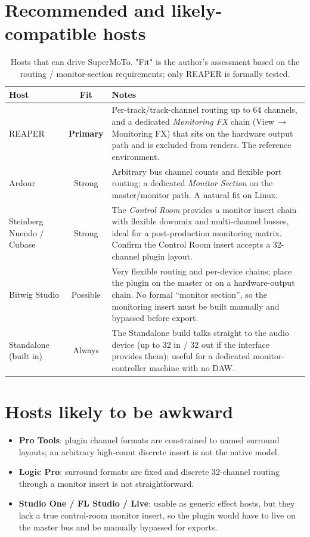 \section{Recommended and likely-compatible hosts}
\begin{table}[ht]
\centering
\renewcommand{\arraystretch}{1.3}
\begin{tabularx}{\textwidth}{l c X}
\toprule
\textbf{Host} & \textbf{Fit} & \textbf{Notes} \\
\midrule
REAPER & \textbf{Primary} &
  Per-track/track-channel routing up to 64 channels, and a dedicated
  \emph{Monitoring FX} chain (\textsf{View\,$\rightarrow$\,Monitoring FX})
  that sits on the hardware output path and is excluded from renders. The
  reference environment. \\
Ardour & Strong &
  Arbitrary bus channel counts and flexible port routing; a dedicated
  \emph{Monitor Section} on the master/monitor path. A natural fit on Linux. \\
Steinberg Nuendo / Cubase & Strong &
  The \emph{Control Room} provides a monitor insert chain with flexible
  downmix and multi-channel busses, ideal for a post-production monitoring
  matrix. Confirm the Control Room insert accepts a 32-channel plugin layout. \\
Bitwig Studio & Possible &
  Very flexible routing and per-device chains; place the plugin on the master
  or on a hardware-output chain. No formal ``monitor section'', so the
  monitoring insert must be built manually and bypassed before export. \\
Standalone (built in) & Always &
  The Standalone build talks straight to the audio device (up to 32 in / 32 out
  if the interface provides them); useful for a dedicated monitor-controller
  machine with no DAW. \\
\bottomrule
\end{tabularx}
\caption{Hosts that can drive SuperMoTo. "Fit" is the author's assessment
based on the routing / monitor-section requirements; only REAPER is formally
tested.}
\label{tab:hosts}
\end{table}

\section{Hosts likely to be awkward}
\begin{itemize}[nosep]
  \item \textbf{Pro Tools}: plugin channel formats are constrained to named
        surround layouts; an arbitrary high-count discrete insert is not the
        native model.
  \item \textbf{Logic Pro}: surround formats are fixed and discrete
        32-channel routing through a monitor insert is not straightforward.
  \item \textbf{Studio One / FL Studio / Live}: usable as generic effect
        hosts, but they lack a true control-room monitor insert, so the
        plugin would have to live on the master bus and be manually bypassed
        for exports.
\end{itemize}

